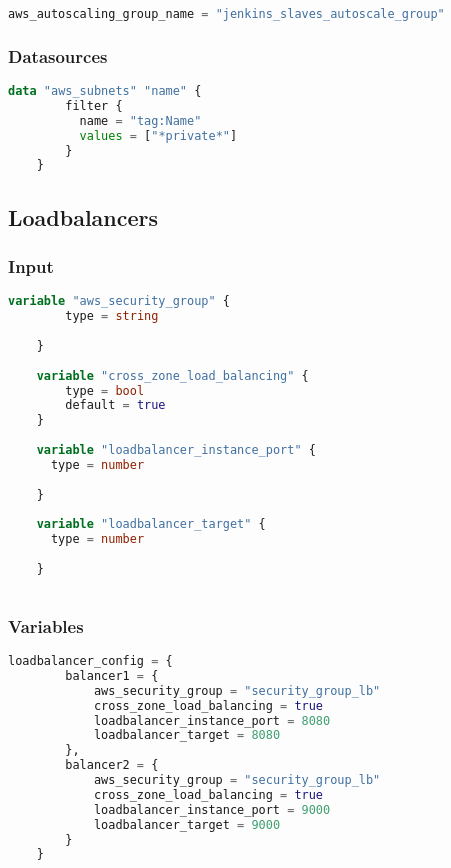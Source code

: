\begin{lstlisting}[language=terraform]
aws_autoscaling_group_name = "jenkins_slaves_autoscale_group"
\end{lstlisting}

\subsubsection{
{Datasources}}

\begin{lstlisting}[language=terraform]
    data "aws_subnets" "name" {
        filter {
          name = "tag:Name"
          values = ["*private*"]
        }
    }
\end{lstlisting}

\subsection{
{Loadbalancers}}
\label{sec:Loadbalancers}

\subsubsection{
{Input}}

\begin{lstlisting}[language=terraform]
    variable "aws_security_group" {
        type = string
      
    }
    
    variable "cross_zone_load_balancing" {
        type = bool
        default = true
    }
    
    variable "loadbalancer_instance_port" {
      type = number
      
    }
    
    variable "loadbalancer_target" {
      type = number
      
    }
    
\end{lstlisting}

\subsubsection{
{Variables}}

\begin{lstlisting}[language=terraform]
    loadbalancer_config = {
        balancer1 = {
            aws_security_group = "security_group_lb"
            cross_zone_load_balancing = true
            loadbalancer_instance_port = 8080
            loadbalancer_target = 8080
        },
        balancer2 = {
            aws_security_group = "security_group_lb"
            cross_zone_load_balancing = true
            loadbalancer_instance_port = 9000
            loadbalancer_target = 9000
        }
    }
\end{lstlisting}

